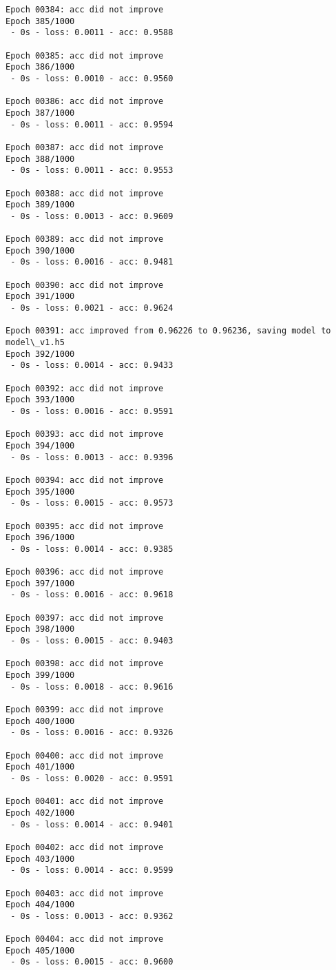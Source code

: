 \documentclass[11pt]{article}
\begin{document}
\begin{Verbatim}[commandchars=\\\{\}]
Epoch 00384: acc did not improve
Epoch 385/1000
 - 0s - loss: 0.0011 - acc: 0.9588

Epoch 00385: acc did not improve
Epoch 386/1000
 - 0s - loss: 0.0010 - acc: 0.9560

Epoch 00386: acc did not improve
Epoch 387/1000
 - 0s - loss: 0.0011 - acc: 0.9594

Epoch 00387: acc did not improve
Epoch 388/1000
 - 0s - loss: 0.0011 - acc: 0.9553

Epoch 00388: acc did not improve
Epoch 389/1000
 - 0s - loss: 0.0013 - acc: 0.9609

Epoch 00389: acc did not improve
Epoch 390/1000
 - 0s - loss: 0.0016 - acc: 0.9481

Epoch 00390: acc did not improve
Epoch 391/1000
 - 0s - loss: 0.0021 - acc: 0.9624

Epoch 00391: acc improved from 0.96226 to 0.96236, saving model to model\_v1.h5
Epoch 392/1000
 - 0s - loss: 0.0014 - acc: 0.9433

Epoch 00392: acc did not improve
Epoch 393/1000
 - 0s - loss: 0.0016 - acc: 0.9591

Epoch 00393: acc did not improve
Epoch 394/1000
 - 0s - loss: 0.0013 - acc: 0.9396

Epoch 00394: acc did not improve
Epoch 395/1000
 - 0s - loss: 0.0015 - acc: 0.9573

Epoch 00395: acc did not improve
Epoch 396/1000
 - 0s - loss: 0.0014 - acc: 0.9385

Epoch 00396: acc did not improve
Epoch 397/1000
 - 0s - loss: 0.0016 - acc: 0.9618

Epoch 00397: acc did not improve
Epoch 398/1000
 - 0s - loss: 0.0015 - acc: 0.9403

Epoch 00398: acc did not improve
Epoch 399/1000
 - 0s - loss: 0.0018 - acc: 0.9616

Epoch 00399: acc did not improve
Epoch 400/1000
 - 0s - loss: 0.0016 - acc: 0.9326

Epoch 00400: acc did not improve
Epoch 401/1000
 - 0s - loss: 0.0020 - acc: 0.9591

Epoch 00401: acc did not improve
Epoch 402/1000
 - 0s - loss: 0.0014 - acc: 0.9401

Epoch 00402: acc did not improve
Epoch 403/1000
 - 0s - loss: 0.0014 - acc: 0.9599

Epoch 00403: acc did not improve
Epoch 404/1000
 - 0s - loss: 0.0013 - acc: 0.9362

Epoch 00404: acc did not improve
Epoch 405/1000
 - 0s - loss: 0.0015 - acc: 0.9600


\end{Verbatim}
\end{document}
